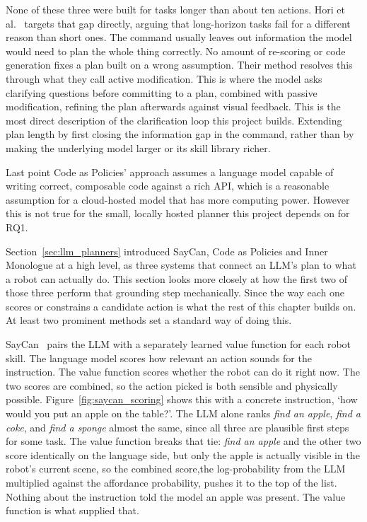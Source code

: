 None of these three were built for tasks longer than about ten actions. Hori et al.\ \cite{hori2025longhorizon} 
targets that gap directly, arguing that long-horizon tasks fail for a different reason than short ones. 
The command usually leaves out information the model would need to plan the whole thing correctly. 
No amount of re-scoring or code generation fixes a plan built on a wrong assumption. Their method resolves 
this through what they call active
modification. This is where the model asks clarifying questions before committing to a plan, combined with
passive modification, refining the plan afterwards against visual feedback. This is the most
direct description of the clarification loop this project builds. Extending plan length by first
closing the information gap in the command, rather than by making the underlying model larger or its skill library richer.


Last point Code as Policies'
approach assumes a language model capable of writing correct, composable code against a rich API, which is a 
reasonable assumption for a cloud-hosted model that has more computing power. However this is not true for 
the small, locally hosted planner this project depends on for RQ1.

\label{sec:grounding}

Section~\ref{sec:llm_planners} introduced SayCan, Code as Policies and Inner Monologue at a high
level, as three systems that connect an LLM's plan to what a robot can actually do. This section
looks more closely at how the first two of those three perform that grounding step mechanically.
Since the way each one scores or constrains a candidate action is what the rest of this chapter
builds on. At least two prominent methods set a standard way of doing this. 

SayCan~\cite{ahn2022saycan} pairs the LLM with a separately learned value function for
each robot skill. The language model scores how relevant an action sounds for the instruction. The
value function scores whether the robot can do it right now. The two scores are combined, so the
action picked is both sensible and physically possible. Figure~\ref{fig:saycan_scoring} shows this
with a concrete instruction, `how would you put an apple on the table?'. The LLM alone ranks
\emph{find an apple}, \emph{find a coke}, and \emph{find a sponge} almost the same, since all three
are plausible first steps for some task. The value function breaks that tie: \emph{find an apple}
and the other two score identically on the language side, but only the apple is actually visible in
the robot's current scene, so the combined score,the log-probability from the LLM multiplied against
the affordance probability, pushes it to the top of the list. Nothing about the instruction told the
model an apple was present. The value function is what supplied that.

